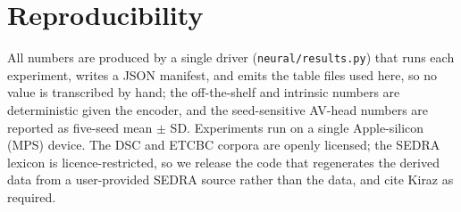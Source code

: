 \documentclass[11pt]{article}
\begin{document}
\section*{Reproducibility}
All numbers are produced by a single driver (\texttt{neural/results.py}) that runs
each experiment, writes a JSON manifest, and emits the table files used here, so no
value is transcribed by hand; the off-the-shelf and intrinsic numbers are
deterministic given the encoder, and the seed-sensitive AV-head numbers are
reported as five-seed mean $\pm$ SD. Experiments run on a single Apple-silicon
(MPS) device. The DSC \citep{digitalsyriaccorpus} and ETCBC corpora
\citep{etcbcsyriac} are openly licensed; the SEDRA lexicon \citep{kiraz1994sedra}
is licence-restricted, so we release the code that regenerates the derived data
from a user-provided SEDRA source rather than the data, and cite Kiraz as required.



\end{document}
